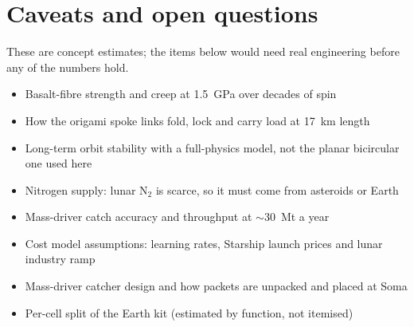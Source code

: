 \documentclass[11pt,a4paper]{article}
\begin{document}
\section{Caveats and open questions}
These are concept estimates; the items below would need real engineering before any of
the numbers hold.
\begin{itemize}[leftmargin=1.2em,itemsep=0.2em,label=\fbox{\phantom{\scriptsize x}}]
  \item Basalt-fibre strength and creep at \SI{1.5}{GPa} over decades of spin
  \item How the origami spoke links fold, lock and carry load at \SI{17}{km} length
  \item Long-term orbit stability with a full-physics model, not the planar
  bicircular one used here
  \item Nitrogen supply: lunar N$_2$ is scarce, so it must come from asteroids or Earth
  \item Mass-driver catch accuracy and throughput at $\sim$\SI{30}{Mt} a year
  \item Cost model assumptions: learning rates, Starship launch prices and lunar
  industry ramp
  \item Mass-driver catcher design and how packets are unpacked and placed at Soma
  \item Per-cell split of the Earth kit (estimated by function, not itemised)
\end{itemize}
\end{document}
